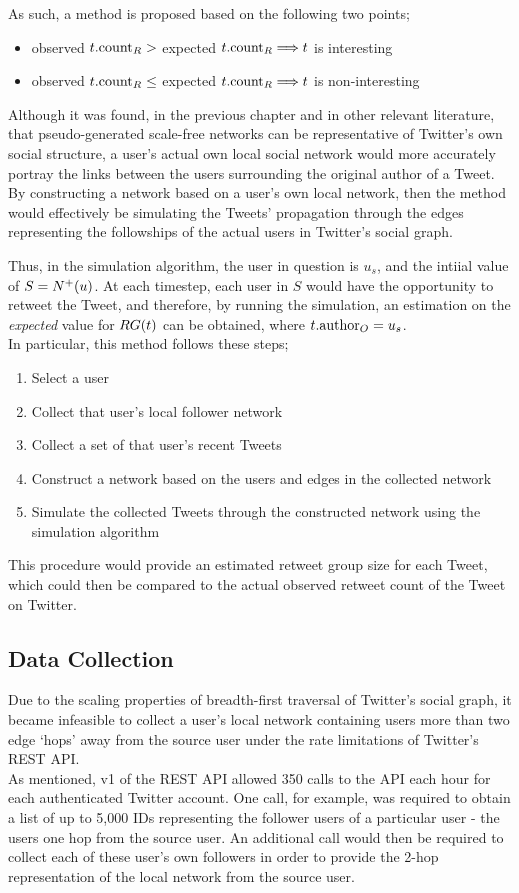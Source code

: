 As such, a method is proposed based on the following two points;
\begin{itemize}
    \item observed $t.\textrm{count}_R >$ expected $t.\textrm{count}_R \Longrightarrow t$ is interesting
    \item observed $t.\textrm{count}_R \leq$ expected $t.\textrm{count}_R \Longrightarrow t$ is non-interesting
\end{itemize}

Although it was found, in the previous chapter and in other relevant literature, that pseudo-generated scale-free networks can be representative of Twitter's own social structure, a user's actual own local social network would more accurately portray the links between the users surrounding the original author of a Tweet. By constructing a network based on a user's own local network, then the method would effectively be simulating the Tweets' propagation through the edges representing the followships of the actual users in Twitter's social graph.

Thus, in the simulation algorithm, the user in question is $u_s$, and the intiial value of $S = N^+(u)$. At each timestep, each user in $S$ would have the opportunity to retweet the Tweet, and therefore, by running the simulation, an estimation on the \textit{expected} value for $RG(t)$ can be obtained, where $t.\textrm{author}_O = u_s$.\\
In particular, this method follows these steps;
\begin{enumerate}
    \item Select a user
    \item Collect that user's local follower network 
    \item Collect a set of that user's recent Tweets
    \item Construct a network based on the users and edges in the collected network
    \item Simulate the collected Tweets through the constructed network using the simulation algorithm
\end{enumerate}

This procedure would provide an estimated retweet group size for each Tweet, which could then be compared to the actual observed retweet count of the Tweet on Twitter.


\subsection{Data Collection}
Due to the scaling properties of breadth-first traversal of Twitter's social graph, it became infeasible to collect a user's local network containing users more than two edge `hops' away from the source user under the rate limitations of Twitter's REST API.\\
As mentioned, v1 of the REST API allowed 350 calls to the API each hour for each authenticated Twitter account. One call, for example, was required to obtain a list of up to 5,000 IDs representing the follower users of a particular user - the users one hop from the source user. An additional call would then be required to collect each of these user's own followers in order to provide the 2-hop representation of the local network from the source user.

